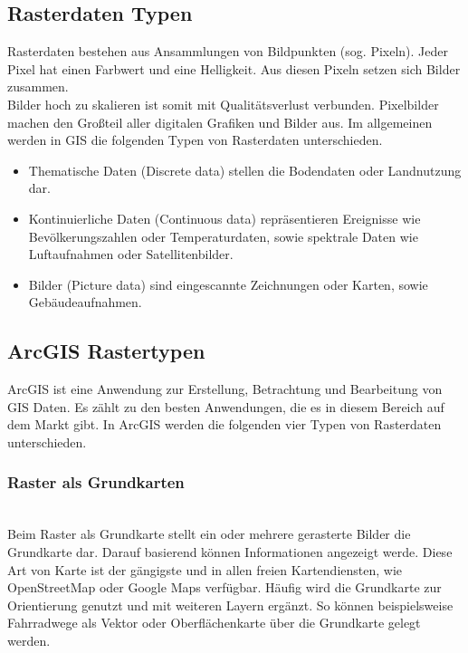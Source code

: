 \documentclass[10pt,conference,compsocconf]{IEEEtran}
\begin{document}
\subsection{Rasterdaten Typen}
Rasterdaten bestehen aus Ansammlungen von Bildpunkten (sog. Pixeln). Jeder Pixel hat einen Farbwert und eine Helligkeit. Aus diesen Pixeln setzen sich Bilder zusammen.\\
Bilder hoch zu skalieren ist somit mit Qualitätsverlust verbunden. Pixelbilder machen den Großteil aller digitalen Grafiken und Bilder aus. Im allgemeinen werden in GIS die folgenden Typen von Rasterdaten unterschieden\cite{mariuszMaster}.

\begin{itemize}
  \item Thematische Daten (Discrete data) stellen die Bodendaten oder Landnutzung dar.
  \item Kontinuierliche Daten (Continuous data) repräsentieren Ereignisse wie Bevölkerungszahlen oder Temperaturdaten, sowie spektrale Daten wie Luftaufnahmen oder Satellitenbilder.
  \item Bilder (Picture data) sind eingescannte Zeichnungen oder Karten, sowie Gebäudeaufnahmen.\\
\end{itemize}

\subsection{ArcGIS Rastertypen}
ArcGIS ist eine Anwendung zur Erstellung, Betrachtung und Bearbeitung von GIS Daten. Es zählt zu den besten Anwendungen, die es in diesem Bereich auf dem Markt gibt. In ArcGIS werden die folgenden vier Typen von Rasterdaten unterschieden.\\

\subsubsection{Raster als Grundkarten}\hspace*{\fill} \\
\label{sub:raster_grundkarte}Beim Raster als Grundkarte stellt ein oder mehrere gerasterte Bilder die Grundkarte dar. Darauf basierend können Informationen angezeigt werde. Diese Art von Karte ist der gängigste und in allen freien Kartendiensten, wie OpenStreetMap oder Google Maps verfügbar. Häufig wird die Grundkarte zur Orientierung genutzt und mit weiteren Layern ergänzt. So können beispielsweise Fahrradwege als Vektor oder Oberflächenkarte über die Grundkarte gelegt werden.
\end{document}
